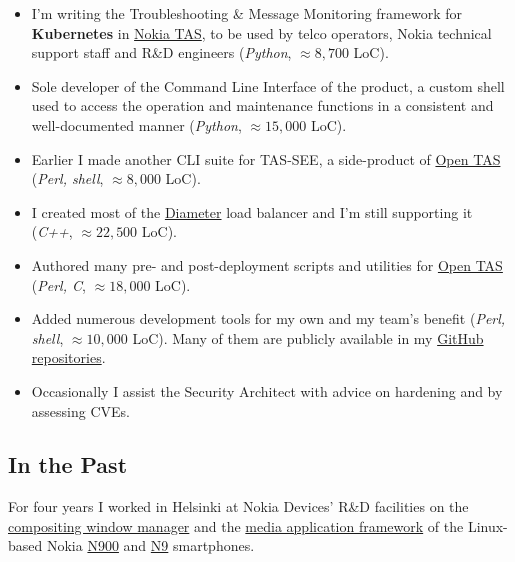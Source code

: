 \documentclass[a4paper,12pt]{article}
\newcommand\Yell{\textbf}
\newcommand{\compress}{\setlength\itemsep{-\parskip}}
\newenvironment{compressedItemize}{\begin{itemize}\compress}{\end{itemize}}
\begin{document}
\begin{compressedItemize}
\item	I'm writing the Troubleshooting \& Message Monitoring framework for
	\Yell{Kubernetes} in \hyperlink{TAS}{Nokia TAS}, to be used by telco
	operators, Nokia technical support staff and R\&D engineers
	(\textit{Python}, $\approx 8{,}700$ LoC).
\item	Sole developer of the Command Line Interface of the product,
	a custom shell used to access the operation and maintenance
	functions in a consistent and well-documented manner
	(\textit{Python}, $\approx 15{,}000$ LoC).
\item	Earlier I made another CLI suite for TAS-SEE, a side-product of
	\hyperlink{TAS}{Open TAS} (\textit{Perl, shell}, $\approx 8{,}000$ LoC).
\item	I created most of the \href{http://tools.ietf.org/html/rfc6733}{Diameter}
	load balancer and I'm still supporting it
	(\textit{C++}, $\approx 22{,}500$ LoC).
\item	Authored many pre- and post-deployment scripts and utilities for
	\hyperlink{TAS}{Open TAS} (\textit{Perl, C}, $\approx 18{,}000$ LoC).
\item	Added numerous development tools for my own and my team's benefit
	(\textit{Perl, shell}, $\approx 10{,}000$ LoC).  Many of them are
	publicly available in my \href{http://github.com/enadam?tab=repositories}%
	{GitHub repositories}.
\item	Occasionally I assist the Security Architect with advice on hardening
	and by assessing CVEs.
\end{compressedItemize}

\subsection*{In the Past}

For four years I worked in Helsinki at \hypertarget{gadgets}{Nokia Devices'
R\&D facilities} on the
\href{http://wiki.maemo.org/Documentation/Maemo_5_Developer_Guide/Architecture/UI_Framework#hildon-desktop}{compositing window manager} and the
\href{http://wiki.maemo.org/Documentation/Maemo_5_Developer_Guide/Using_Multimedia_Components/Media_Application_Framework_(MAFW)}{media application framework}
of the Linux-based Nokia \href{http://maemo.org/intro/maemo_history}{N900}
and \href{http://en.wikipedia.org/wiki/Nokia_N9}{N9} smartphones.
\end{document}
